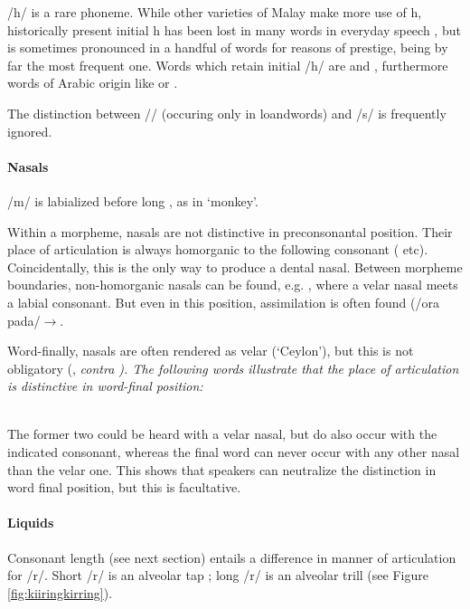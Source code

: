 /h/ is a rare phoneme. While other varieties of Malay make more use of h, historically present initial h has been lost in many words in everyday speech \citep[ch.4.3]{Paauw2004}, but is sometimes pronounced in a handful of words for reasons of prestige,  being by far the most frequent one. Words which retain initial /h/ are  and , furthermore words of Arabic origin like  or .

The distinction between /\textesh/ (occuring only in loandwords) and /s/ is frequently ignored.

\paragraph{Nasals}
/m/ is  labialized before long , as in  `monkey'.


Within a morpheme, nasals are not distinctive in preconsonantal position. Their place of articulation is always homorganic to the following consonant ( etc). Coincidentally, this is the only way to produce a dental nasal.  Between morpheme boundaries, non-homorganic nasals can be found, e.g. , where a velar nasal meets a labial consonant. But even in this position, assimilation is often found (/ora\ng{} pada/$\to$.

 Word-finally,  nasals are often rendered as velar (`Ceylon'), but this is not obligatory (\citet{Bichsel, SmithEtAl2004}, \em contra \em \citet{Adelaar1991}). The following words illustrate that the place of articulation is distinctive in word-final position:


 \\
The former two could be heard with a velar nasal, but do also occur with the indicated consonant, whereas the final word can never occur with any other nasal than the velar one. This shows that speakers can neutralize the distinction in word final position, but this is facultative.


\paragraph{Liquids}
Consonant length (see next section) entails a difference in manner of articulation for /r/. Short /r/ is an alveolar tap ; long /r/ is an alveolar trill  (see Figure \ref{fig:kiiringkirring}).

